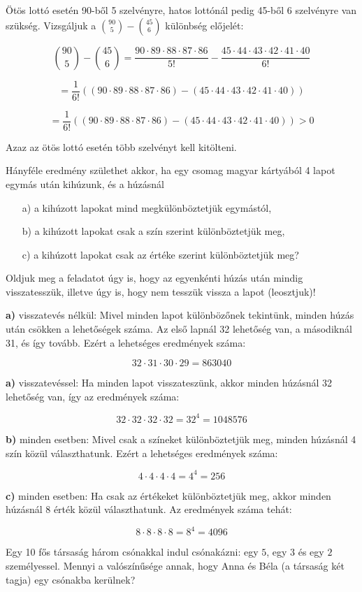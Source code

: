 \begin{solution}
Ötös lottó esetén 90-ből 5 szelvényre, hatos lottónál pedig 45-ből
6 szelvényre van szükség. Vizsgáljuk a $\binom{90}{5}-\binom{45}{6}$
különbség előjelét:

\[
\binom{90}{5}-\binom{45}{6}=\frac{90\cdot89\cdot88\cdot87\cdot86}{5!}-\frac{45\cdot44\cdot43\cdot42\cdot41\cdot40}{6!}
\]

\[
=\frac{1}{6!}\left((90\cdot89\cdot88\cdot87\cdot86)-(45\cdot44\cdot43\cdot42\cdot41\cdot40)\right)
\]

\[
=\frac{1}{6!}\left((90\cdot89\cdot88\cdot87\cdot86)-(45\cdot44\cdot43\cdot42\cdot41\cdot40)\right)>0
\]

Azaz az ötös lottó esetén több szelvényt kell kitölteni.
\end{solution}
\begin{extraproblem}
Hányféle eredmény születhet akkor, ha egy csomag magyar kártyából
4 lapot egymás után kihúzunk, és a húzásnál
\begin{itemize}
\item[a)] a kihúzott lapokat mind megkülönböztetjük egymástól, 
\item[b)] a kihúzott lapokat csak a szín szerint különböztetjük meg, 
\item[c)] a kihúzott lapokat csak az értéke szerint különböztetjük meg? 
\end{itemize}
Oldjuk meg a feladatot úgy is, hogy az egyenkénti húzás után mindig
visszatesszük, illetve úgy is, hogy nem tesszük vissza a lapot (leosztjuk)!
\end{extraproblem}

\begin{solution}
\textbf{a)} visszatevés nélkül: Mivel minden lapot különbözőnek tekintünk,
minden húzás után csökken a lehetőségek száma. Az első lapnál 32 lehetőség
van, a másodiknál 31, és így tovább. Ezért a lehetséges eredmények
száma:

\[
32\cdot31\cdot30\cdot29=863040
\]

\textbf{a)} visszatevéssel: Ha minden lapot visszateszünk, akkor minden
húzásnál 32 lehetőség van, így az eredmények száma:

\[
32\cdot32\cdot32\cdot32=32^{4}=1048576
\]

\textbf{b)} minden esetben: Mivel csak a színeket különböztetjük meg,
minden húzásnál 4 szín közül választhatunk. Ezért a lehetséges eredmények
száma:

\[
4\cdot4\cdot4\cdot4=4^{4}=256
\]

\textbf{c)} minden esetben: Ha csak az értékeket különböztetjük meg,
akkor minden húzásnál 8 érték közül választhatunk. Az eredmények száma
tehát:

\[
8\cdot8\cdot8\cdot8=8^{4}=4096
\]
\end{solution}
\begin{extraproblem}
Egy 10 fős társaság három csónakkal indul csónakázni: egy $5$, egy
$3$ és egy $2$ személyessel. Mennyi a valószínűsége annak, hogy
Anna és Béla (a társaság két tagja) egy csónakba kerülnek? 
\end{extraproblem}

